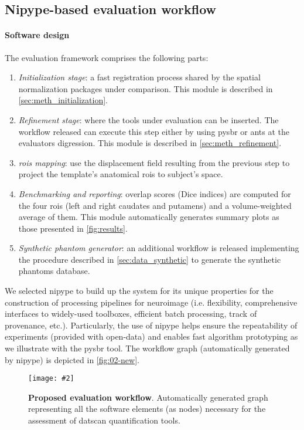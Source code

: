 \documentclass{frontiers}
\newcommand{\insertgraphic}[2]{\texttt{[image: \#2]}}
\newcommand{\insertgraphic}[2]{\texttt{[image: \#2]}}
\newcommand{\emitem}[1]{\item \emph{#1}}
\begin{document}
\subsection{Nipype-based evaluation workflow}
\label{sec:evaluation}
\paragraph{Software design}\label{sec:workflow}
The evaluation framework comprises the following parts: 
\begin{enumerate}
\emitem{Initialization stage}: a fast registration process shared by the
  spatial normalization packages under comparison. This module is described
  in \autoref{sec:meth_initialization}.
\emitem{Refinement stage}: where the tools under evaluation can be inserted.
  The workflow released can execute this step either by using \gls*{pysbr} 
  or \gls*{ants} at the evaluators digression. This module is described
  in \autoref{sec:meth_refinement}.
\emitem{\Glspl{roi} mapping}: use the displacement field resulting from
  the previous step to project the template's anatomical \glspl*{roi} to
  subject's space.
\emitem{Benchmarking and reporting}: overlap scores (Dice indices) are
  computed for the four \glspl*{roi} (left and right caudates and putamens)
  and a volume-weighted average of them. This module automatically generates
  summary plots as those presented in \autoref{fig:results}.
\emitem{Synthetic phantom generator}: an additional workflow is released
  implementing the procedure described in \autoref{sec:data_synthetic} to
  generate the synthetic phantoms database.
\end{enumerate}
We selected \gls*{nipype} to build up the system for its unique properties for
  the construction of processing pipelines for neuroimage (i.e. flexibility,
  comprehensive interfaces to widely-used toolboxes, efficient batch processing,
  track of provenance, etc.).
Particularly, the use of \gls*{nipype} helps ensure the repeatability of
  experiments (provided with open-data) and enables fast algorithm prototyping
  as we illustrate with the \gls*{pysbr} tool.
The workflow graph (automatically generated by \gls*{nipype}) is depicted in 
  \autoref{fig:02-new}.

\begin{figure*}[!ht]
  \centering
    \insertgraphic{width=\linewidth}{figures/04-nipype-workflow}
  \caption{\label{fig:02-new}
  \textbf{Proposed evaluation workflow}. Automatically generated graph 
  representing all the software elements (as nodes) necessary
  for the assessment of \gls*{datscan} quantification tools.}
\end{figure*}
\end{document}
